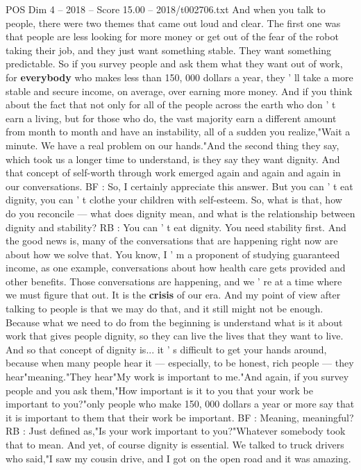 \begin{textsample}{POS Dim 4 – 2018 – Score 15.00 – 2018/t002706.txt}
And when you talk to people, there were two themes that came out loud and clear.
The first one was that people are less looking for more money or get out of the fear of the robot taking their job, and they just want something stable.
They want something predictable.
So if you survey people and ask them what they want out of work, for \textbf{everybody} who makes less than 150, 000 dollars a year, they ' ll take a more stable and secure income, on average, over earning more money.
And if you think about the fact that not only for all of the people across the earth who don ' t earn a living, but for those who do, the vast majority earn a different amount from month to month and have an instability, all of a sudden you realize,"Wait a minute.
We have a real problem on our hands."And the second thing they say, which took us a longer time to understand, is they say they want dignity.
And that concept of self-worth through work emerged again and again and again in our conversations.
BF : So, I certainly appreciate this answer.
But you can ' t eat dignity, you can ' t clothe your children with self-esteem.
So, what is that, how do you reconcile — what does dignity mean, and what is the relationship between dignity and stability?
RB : You can ' t eat dignity.
You need stability first.
And the good news is, many of the conversations that are happening right now are about how we solve that.
You know, I ' m a proponent of studying guaranteed income, as one example, conversations about how health care gets provided and other benefits.
Those conversations are happening, and we ' re at a time where we must figure that out.
It is the \textbf{crisis} of our era.
And my point of view after talking to people is that we may do that, and it still might not be enough.
Because what we need to do from the beginning is understand what is it about work that gives people dignity, so they can live the lives that they want to live.
And so that concept of dignity is... it ' s difficult to get your hands around, because when many people hear it — especially, to be honest, rich people — they hear"meaning."They hear"My work is important to me."And again, if you survey people and you ask them,"How important is it to you that your work be important to you?"only people who make 150, 000 dollars a year or more say that it is important to them that their work be important.
BF : Meaning, meaningful?
RB : Just defined as,"Is your work important to you?"Whatever somebody took that to mean.
And yet, of course dignity is essential.
We talked to truck drivers who said,"I saw my cousin drive, and I got on the open road and it was amazing.

\end{textsample}
